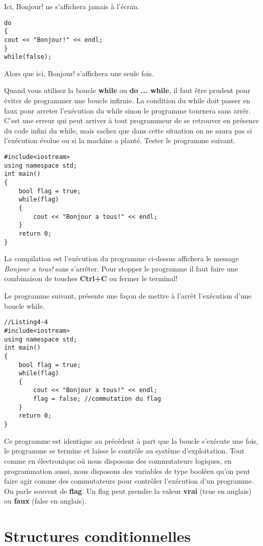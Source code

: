 \documentclass[a4paper, oneside,11pt]{book}
\begin{document}
Ici, Bonjour! ne s'affichera jamais \`a l'\'ecran.

\begin{lstlisting}
do
{
cout << "Bonjour!" << endl;
}
while(false);
\end{lstlisting}
Alors que ici, Bonjour! s'affichera une seule fois. 

Quand vous utilisez la boucle \textbf{while} ou  \textbf{do ... while}, il faut \^etre prudent pour \'eviter de programmer une boucle infirnie. La condition du while doit passer en faux pour arreter 
l'ex\'ecution du while sinon le programme tournera sans arr\^er. C'est une erreur qui peut arriver \`a tout programmeur de se retrouver en pr\'esence  du code infini du while, mais 
sachez que dans cette situation on ne saura pas  si l'ex\'ecution \'evolue ou si la machine a plant\'e. Tester le programme suivant.

\begin{lstlisting}
#include<iostream>
using namespace std;
int main()
{
    bool flag = true;
    while(flag)
    {
        cout << "Bonjour a tous!" << endl;
    }
    return 0;
}
\end{lstlisting}

La compilation est l'ex\'ecution du programme ci-dessus affichera le message \textit{Bonjour a tous!} sans s'arr\^eter. Pour stopper le programme  il faut 
faire une  combinaison de touches \textbf{Ctrl+C} ou fermer le terminal!

Le programme suivant, pr\'esente une fa\c{c}on de mettre \`a l'arr\^et l'ex\'ecution d'une boucle while.

\begin{lstlisting}
//Listing4-4
#include<iostream>
using namespace std;
int main()
{
    bool flag = true;
    while(flag)
    {
        cout << "Bonjour a tous!" << endl;
        flag = false; //commutation du flag
    }
    return 0;
}
\end{lstlisting}
Ce programme est identique  au pr\'ec\'edent \`a part que la boucle s'ex\'ecute une fois, le programme se termine et laisse le contr\^ole au syst\`eme d'exploitation. Tout comme 
en \'electronique o\`u nous disposons des commutateurs logiques, en programmation aussi, nous disposons des variables de type bool\'een qu'on peut faire agir comme des commutateurs
pour contr\^oler l'ex\'ecution d'un programme. On parle souvent de \textbf{flag}. Un flag peut prendre la valeur \textbf{vrai} (true en anglais) ou \textbf{faux} (false en anglais).

  
\section{Structures conditionnelles}
\end{document}
